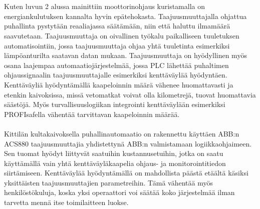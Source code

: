 \documentclass[finnish,12pt,a4paper,pdftex,elec,utf8]{aaltothesis}
\begin{document}
\\\\
Kuten luvun 2 alussa mainittiin moottorinohjaus kuristamalla on energiankulutuksen kannalta hyvin epätehokasta. Taajuusmuuttajalla ohjattua puhallinta pystytään reaaliajassa säätämään, niin että haluttu ilmamäärä saavutetaan. Taajuusmuuttaja on oivallinen työkalu paikalliseen tuuletuksen automatisointiin, jossa taajuusmuuttaja ohjaa yhtä tuuletinta esimerkiksi lämpöanturilta saatavan datan mukaan. Taajuusmuuttaja on hyödyllinen myös osana laajempaa automaatiojärjestelmää, jossa PLC lähettää puhaltimen ohjaussignaalin taajuusmuuttajalle esimerkiksi kenttäväylää hyödyntäen. Kenttäväyliä hyödyntämällä kaapeloinnin määrä vähenee huomattavasti ja etenkin kaivoksissa, missä vetomatkat voivat olla kilometrejä, tuovat huomattavia säästöjä. Myös turvallisuuslogiikan integrointi kenttäväylään esimerkiksi PROFIsafella vähentää tarvittavan kaapeloinnin määrää.
\\\\
Kittilän kultakaivoksella puhallinautomaatio on rakennettu käyttäen ABB:n ACS880 taajuusmuuttajia yhdistettynä ABB:n valmistamaan logiikkaohjaimeen. Sen tuomat hyödyt liittyvät saatuihin kustannusetuihin, jotka on saatu käyttämällä vain yhtä kenttäväyläkaapelia ohjaus- ja monitorointitiedon siirtämiseen. \cite{MyyntiHaastattelu} Kenttäväylää hyödyntämällä on mahdollista päästä etäältä käsiksi yksittäisten taajuusmuuttajien parametreihin. Tämä vähentää myös henkilöstökuluja, koska yksi operaattori voi säätää koko järjestelmää ilman tarvetta mennä itse toimilaitteen luokse.

\end{document}

